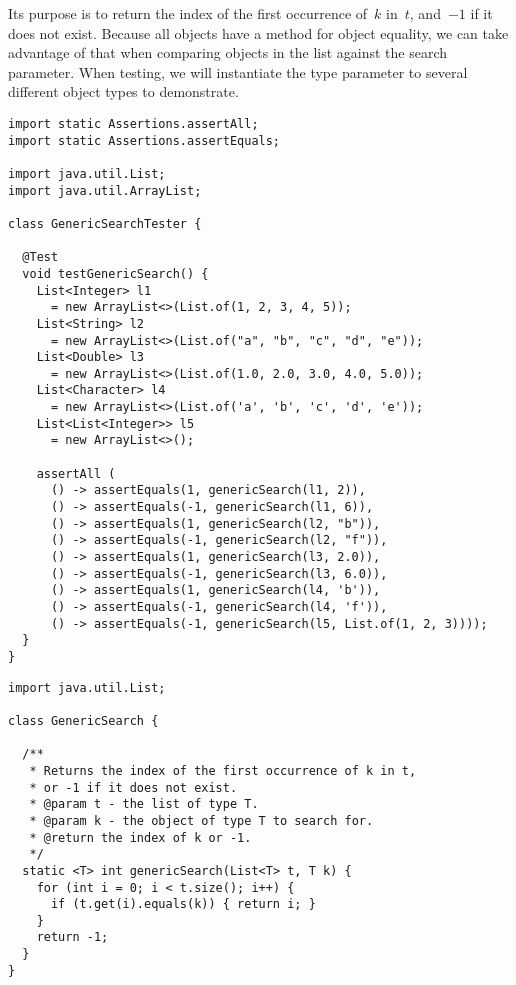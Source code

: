 Its purpose is to return the index of the first occurrence of~$k$ in~$t$, and~$-1$ if it does not exist. 
Because all objects have a  method for object equality, we can take advantage of that when comparing objects in the list against the search parameter. 
When testing, we will instantiate the type parameter to several different object types to demonstrate.

\begin{lstlisting}[language=MyJava]
import static Assertions.assertAll;
import static Assertions.assertEquals;

import java.util.List;
import java.util.ArrayList;

class GenericSearchTester {

  @Test 
  void testGenericSearch() {
    List<Integer> l1 
      = new ArrayList<>(List.of(1, 2, 3, 4, 5));
    List<String> l2 
      = new ArrayList<>(List.of("a", "b", "c", "d", "e"));
    List<Double> l3 
      = new ArrayList<>(List.of(1.0, 2.0, 3.0, 4.0, 5.0));
    List<Character> l4 
      = new ArrayList<>(List.of('a', 'b', 'c', 'd', 'e'));
    List<List<Integer>> l5 
      = new ArrayList<>();

    assertAll (
      () -> assertEquals(1, genericSearch(l1, 2)),
      () -> assertEquals(-1, genericSearch(l1, 6)),
      () -> assertEquals(1, genericSearch(l2, "b")),
      () -> assertEquals(-1, genericSearch(l2, "f")),
      () -> assertEquals(1, genericSearch(l3, 2.0)),
      () -> assertEquals(-1, genericSearch(l3, 6.0)),
      () -> assertEquals(1, genericSearch(l4, 'b')),
      () -> assertEquals(-1, genericSearch(l4, 'f')),
      () -> assertEquals(-1, genericSearch(l5, List.of(1, 2, 3))));
  }
}
\end{lstlisting}

\begin{lstlisting}[language=MyJava]
import java.util.List;

class GenericSearch {

  /**
   * Returns the index of the first occurrence of k in t, 
   * or -1 if it does not exist.
   * @param t - the list of type T.
   * @param k - the object of type T to search for.
   * @return the index of k or -1.
   */
  static <T> int genericSearch(List<T> t, T k) {
    for (int i = 0; i < t.size(); i++) {
      if (t.get(i).equals(k)) { return i; }
    }
    return -1;
  }
}
\end{lstlisting}

